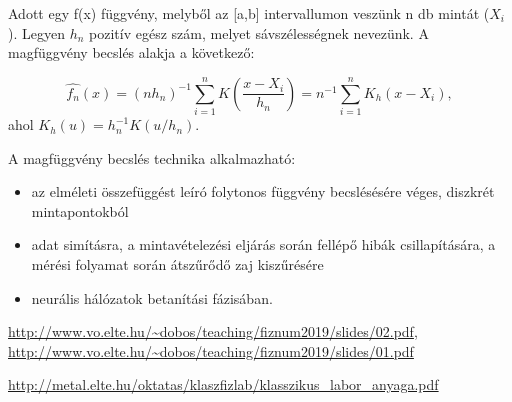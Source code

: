 \documentclass[12pt]{article}
\theoremstyle{plain}
\begin{document}
Adott egy f(x) függvény, melyből az [a,b] intervallumon veszünk n db mintát ($X_i$). Legyen $h_n$ pozitív egész szám, melyet sávszélességnek nevezünk. A magfüggvény becslés alakja a következő: 

$$
\hat{f_n}(x) = (n h_n)^{-1} \sum_{i=1}^n K(\frac{x-X_i}{h_n}) = n^{-1} \sum_{i=1}^n K_h(x-X_i),
$$ ahol $K_h(u) = h_n^{-1}K(u/h_n)$. 

A magfüggvény becslés technika alkalmazható: 
\begin{itemize}
    \item az elméleti összefüggést leíró folytonos függvény becslésésére véges, diszkrét mintapontokból
    \item adat simításra, a mintavételezési eljárás során fellépő hibák csillapítására, a mérési folyamat során átszűrődő zaj kiszűrésére
    \item neurális hálózatok betanítási fázisában. 
\end{itemize}



%
%

\begin{thebibliography}{Nature}

\url{http://www.vo.elte.hu/~dobos/teaching/fiznum2019/slides/02.pdf}, \url{http://www.vo.elte.hu/~dobos/teaching/fiznum2019/slides/01.pdf}

\url{http://metal.elte.hu/oktatas/klaszfizlab/klasszikus_labor_anyaga.pdf}

\end{thebibliography}
\end{document}
